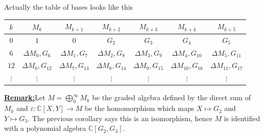 \documentclass[12pt]{article}
\theoremstyle{definition}
\newenvironment{remark}[1]{\par\noindent\underline{\textbf{Remark:}}\space#1}{}
\begin{document}
Actually the table of bases looks like this 
\begin{table}[!h]
    \centering
    \begin{tabular}{c|c|c|c|c|c|c}
        \toprule
            \(k\)  &\(M_k\)   & \(M_{k+1} \) & \(M_{k+2} \)  & \(M_{k+3} \)  & \(M_{k+4} \)  & \(M_{k+5} \)   \\
        \midrule
            \(0\) & \(1\)  & \(0\)  & \(G_2\)  & \(G_3\)  & \(G_4\)  & \(G_5 \)   \\
             \(6\) &\(\Delta M_0,G_6\)  & \(\Delta M_1,G_7\)  &\(\Delta M_2,G_8\)   & \(\Delta M_3,G_9\)  & \(\Delta M_4,G_{10} \)  & \(\Delta M_5,G_{11} \)   \\
             \(12\) & \(\Delta M_6,G_{12} \)   & \(\Delta M_7,G_{13} \)  & \(\Delta M_8,G_{14} \)  & \(\Delta M_9,G_{15} \)  & \(\Delta M_{10} ,G_{16} \)  & \(\Delta M_{11} ,G_{17} \)   \\
            \(\vdots\)  &\(\vdots\)  &\(\vdots\) & \(\vdots\) & \(\vdots\) & \(\vdots\) & \(\vdots\)  \\
        \bottomrule
    \end{tabular}
\end{table}
\begin{remark}
    Let \(M = \bigoplus_{0}^{\infty} M_k \) be the graded algebra defined by the direct sum of \(M_k\) and \(\varepsilon:\mathbb{C} [X,Y]\to M\) be the homomorphism which maps \(X \mapsto G_2\) and \(Y \mapsto G_3\). The previous corollary says this is an isomorphism, hence \(M\) is identified with a polynomial algebra \(\mathbb{C} [G_2,G_3]\).    
\end{remark}
\end{document}

